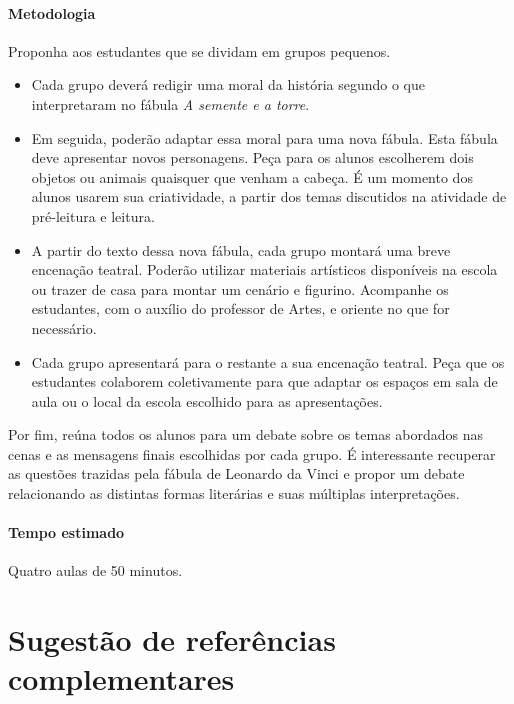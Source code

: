 \documentclass[11pt]{extarticle}
\begin{document}
\paragraph{Metodologia} Proponha aos estudantes que se dividam em grupos pequenos.

\begin{itemize}

\item Cada grupo deverá redigir uma moral da história segundo o que interpretaram no fábula \textit{A semente e a torre}.

\item Em seguida, poderão adaptar essa moral para uma nova fábula. Esta fábula deve apresentar novos personagens. Peça para os alunos escolherem dois objetos ou animais quaisquer que venham a cabeça. É um momento dos alunos usarem sua criatividade, a partir dos temas discutidos na atividade de pré-leitura e leitura.

\item A partir do texto dessa nova fábula, cada grupo montará uma breve encenação teatral. Poderão utilizar materiais artísticos disponíveis na escola ou trazer de casa para montar um cenário e figurino. Acompanhe os estudantes, com o auxílio do professor de Artes, e oriente no que for necessário. 

\item Cada grupo apresentará para o restante a sua encenação teatral. Peça que os estudantes colaborem coletivamente para que adaptar os espaços em sala de aula ou o local da escola escolhido para as apresentações. 

\end{itemize}

Por fim, reúna todos os alunos para um debate sobre os temas abordados nas cenas e as mensagens finais escolhidas por cada grupo. É interessante recuperar as questões trazidas pela fábula de Leonardo da Vinci e propor um debate relacionando as distintas formas literárias e suas múltiplas interpretações.

\paragraph{Tempo estimado} Quatro aulas de 50 minutos.

\section{Sugestão de referências complementares}
\end{document}
